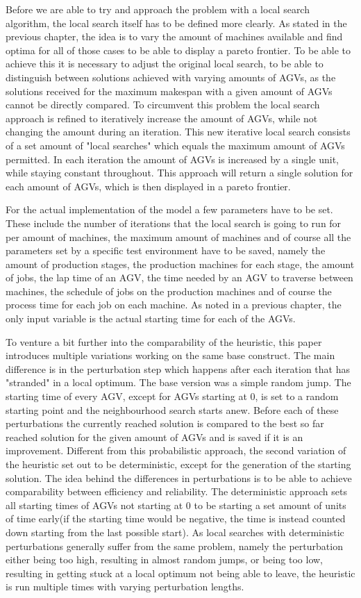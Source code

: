 Before we are able to try and approach the problem with a local search algorithm, the local search itself has to be defined more clearly. As stated
in the previous chapter, the idea is to vary the amount of machines available and find optima for all of those cases to be able to display a pareto
frontier. To be able to achieve this it is necessary to adjust the original local search, to be able to distinguish between solutions achieved with
varying amounts of AGVs, as the solutions received for the maximum makespan with a given amount of AGVs cannot be directly
compared. To circumvent this problem the local search approach is refined to iteratively increase the amount of AGVs, while not changing the amount
during an iteration. This new iterative local search consists of a set amount of "local searches" which equals the maximum amount of AGVs permitted.
In each iteration the amount of AGVs is increased by a single unit, while staying constant throughout. This approach will return a single solution for
each amount of AGVs, which is then displayed in a pareto frontier.

For the actual implementation of the model a few parameters have to be set. These include the number of iterations that the local search is going
to run for per amount of machines, the maximum amount of machines and of course all the parameters set by a specific test environment have to be
saved, namely the amount of production stages, the production machines for each stage, the amount of jobs, the lap time of an AGV, the time needed 
by an AGV to traverse between machines, the schedule of jobs on the production machines and of course the process time for each job on each machine.
As noted in a previous chapter, the only input variable is the actual starting time for each of the AGVs.

To venture a bit further into the comparability of the heuristic, this paper introduces multiple variations working on the same base construct.
The main difference is in the perturbation step which happens after each iteration that has "stranded" in a local optimum. The base version was
a simple random jump. The starting time of every AGV, except for AGVs starting at 0, is set to a random starting point and the neighbourhood
search starts anew. Before each of these perturbations the currently reached solution is compared to the best so far reached solution for the given
amount of AGVs and is saved if it is an improvement. Different from this probabilistic approach, the second variation of the heuristic set out to
be deterministic, except for the generation of the starting solution. The idea behind the differences in perturbations is to be able to achieve
comparability between efficiency and reliability. The deterministic approach sets all starting times of AGVs not starting at 0 to be starting
a set amount of units of time early(if the starting time would be negative, the time is instead counted down starting from the last possible start).
As local searches with deterministic perturbations generally suffer from the same problem, namely the perturbation either being too high, resulting
in almost random jumps, or being too low, resulting in getting stuck at a local optimum not being able to leave, the heuristic is run multiple
times with varying perturbation lengths.

